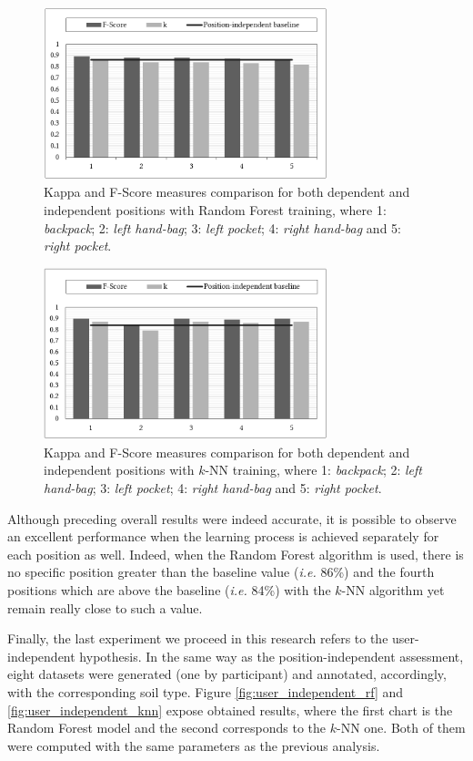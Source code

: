 \documentclass[conference]{IEEEtran}
\begin{document}
\begin{figure}[!b]
  \centering
  \includegraphics[width=3.25in]{position_independent_rf}
  \caption{Kappa and F-Score measures comparison for both dependent and independent positions with Random Forest training, where 1: \textit{backpack}; 2: \textit{left hand-bag}; 3: \textit{left pocket}; 4: \textit{right hand-bag} and 5: \textit{right pocket}.}
  \label{fig:position_independent_rf}
\end{figure}

\begin{figure}[!t]
  \centering
  \includegraphics[width=3.25in]{position_independent_knn}
  \caption{Kappa and F-Score measures comparison for both dependent and independent positions with $k$-NN training, where 1: \textit{backpack}; 2: \textit{left hand-bag}; 3: \textit{left pocket}; 4: \textit{right hand-bag} and 5: \textit{right pocket}.}
  \label{fig:position_independent_knn}
\end{figure}

Although preceding overall results were indeed accurate, it is possible to observe an excellent performance when the learning process is achieved separately for each position as well. Indeed, when the Random Forest algorithm is used, there is no specific position greater than the baseline value (\textit{i.e.} 86\%) and the fourth positions which are above the baseline (\textit{i.e.} 84\%) with the $k$-NN algorithm yet remain really close to such a value.

Finally, the last experiment we proceed in this research refers to the user-independent hypothesis. In the same way as the position-independent assessment, eight datasets were generated (one by participant) and annotated, accordingly, with the corresponding soil type. Figure \ref{fig:user_independent_rf} and \ref{fig:user_independent_knn} expose obtained results, where the first chart is the Random Forest model and the second corresponds to the $k$-NN one. Both of them were computed with the same parameters as the previous analysis.
\end{document}
